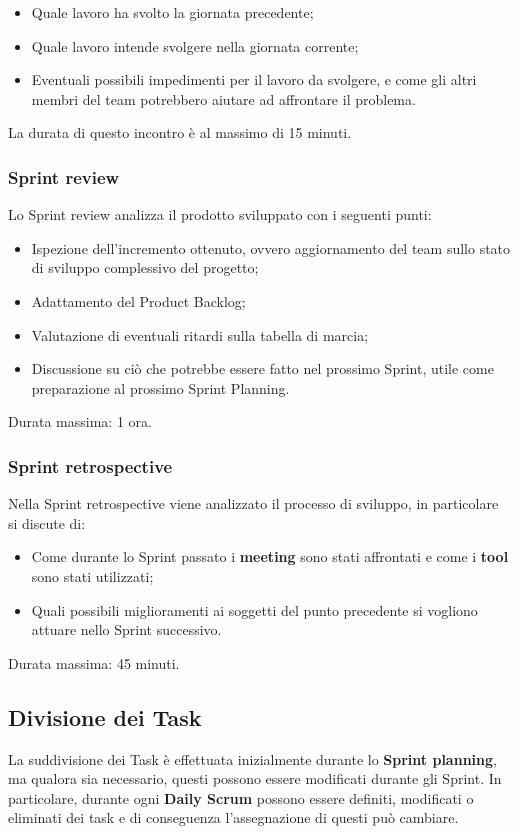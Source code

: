 \begin{itemize}
    \item Quale lavoro ha svolto la giornata precedente;
    \item Quale lavoro intende svolgere nella giornata corrente;
    \item Eventuali possibili impedimenti per il lavoro da svolgere, e come gli altri membri del team potrebbero aiutare ad affrontare il problema.
\end{itemize}
La durata di questo incontro è al massimo di 15 minuti.

\subsubsection{Sprint review}
Lo Sprint review analizza il prodotto sviluppato con i seguenti punti:

\begin{itemize}
    \item Ispezione dell'incremento ottenuto, ovvero aggiornamento del team sullo stato di sviluppo complessivo del progetto;
    \item Adattamento del Product Backlog;
    \item Valutazione di eventuali ritardi sulla tabella di marcia;
    \item Discussione su ciò che potrebbe essere fatto nel prossimo Sprint, utile come preparazione al prossimo Sprint Planning.
\end{itemize}
Durata massima: 1 ora.

\subsubsection{Sprint retrospective}
Nella Sprint retrospective viene analizzato il processo di sviluppo, in particolare si discute di:

\begin{itemize}
    \item Come durante lo Sprint passato i \textbf{meeting} sono stati affrontati e come i \textbf{tool} sono stati utilizzati;
    \item Quali possibili miglioramenti ai soggetti del punto precedente si vogliono attuare nello Sprint successivo.
\end{itemize}
Durata massima: 45 minuti.

\subsection{Divisione dei Task}
La suddivisione dei Task è effettuata inizialmente durante lo \textbf{Sprint planning}, ma qualora sia necessario, questi possono essere modificati durante gli Sprint. In particolare, durante ogni \textbf{Daily Scrum} possono essere definiti, modificati o eliminati dei task e di conseguenza l'assegnazione di questi può cambiare.

